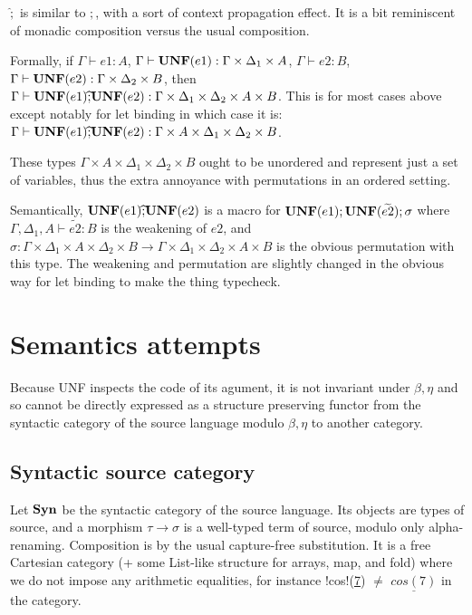 $\widehat{;}$ is similar to $;$, with a sort of context propagation effect. 
It is a bit reminiscent of monadic composition versus the usual composition.

Formally, if $\Gamma\vdash e1: A$, $\Gamma\vdash \mathbf{UNF}(e1): \Gamma\times\Delta_1\times A$, $\Gamma\vdash e2: B$, $\Gamma\vdash \mathbf{UNF}(e2): \Gamma\times\Delta_2\times B$, then $\Gamma\vdash \mathbf{UNF}(e1) \widehat{;} \mathbf{UNF}(e2): \Gamma\times \Delta_1\times \Delta_2 \times A \times B$.
This is for most cases above except notably for let binding in which case it is: 
 $\Gamma\vdash \mathbf{UNF}(e1) \widehat{;} \mathbf{UNF}(e2): \Gamma\times A \times \Delta_1\times \Delta_2 \times B$. 

 These types $\Gamma\times A \times \Delta_1\times \Delta_2 \times B$ ought to be unordered and represent just a set of variables, thus the extra annoyance with permutations in an ordered setting. 

 Semantically, $\mathbf{UNF}(e1) \widehat{;} \mathbf{UNF}(e2)$ is a macro for $\mathbf{UNF}(e1) ; \mathbf{UNF}(\widetilde{e2}); \sigma$ where $\Gamma,\Delta_1,A\vdash \widetilde{e2}:B$ is the weakening of $e2$, and $\sigma: \Gamma\times\Delta_1\times A \times \Delta_2 \times B \to \Gamma\times\Delta_1\times \Delta_2 \times A\times B$ is the obvious permutation with this type.
The weakening and permutation are slightly changed in the obvious way for let binding to make the thing typecheck. 




\section{Semantics attempts}

Because UNF inspects the code of its agument, it is not invariant under $\beta,\eta$ and so cannot be directly expressed as a structure preserving functor from the syntactic category of the source language modulo $\beta,\eta$ to another category. 

\subsection{Syntactic source category}

Let $\mathbf{Syn}$ be the syntactic category of the source language. Its objects are types of source, and a morphism $\tau \to \sigma$ is a well-typed term of source, modulo only alpha-renaming. Composition is by the usual capture-free substitution. It is a free Cartesian category (+ some List-like structure for arrays, map, and fold) where we do not impose any arithmetic equalities, for instance !cos!(\underline{7}) $\neq$ $\underline{cos(7)}$ in the category.


